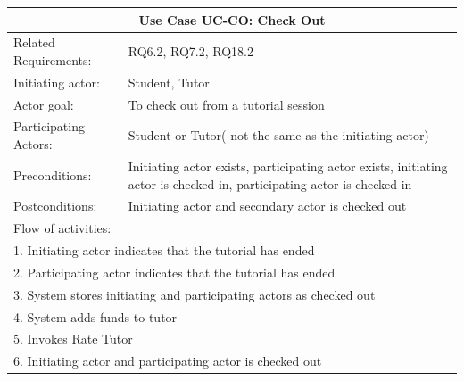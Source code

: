 \documentclass[12pt]{article}
\begin{document}
		\begin{tabular}{| l | p{10cm}| }
			\hline\multicolumn{2}{|c|}{ \textbf{Use Case UC-CO: Check Out } }\\ \hline
			Related Requirements: &  RQ6.2, RQ7.2, RQ18.2\\ \hline
			Initiating actor: & Student, Tutor \\ \hline
			Actor goal: & To check out from a tutorial session\\ \hline
			Participating Actors: & Student or Tutor( not the same as the initiating actor)\\ \hline
			Preconditions: &Initiating actor exists, participating actor exists, initiating actor is checked in, participating actor is checked in\\ \hline
			Postconditions: &Initiating actor and secondary actor is checked out\\ \hline
			\multicolumn{2}{|l|}{Flow of activities:}\\ \hline
			\multicolumn{2}{|p{15cm}|}{1. Initiating actor indicates that the tutorial has ended}\\
			\multicolumn{2}{|p{15cm}|}{2. Participating actor indicates that the tutorial has ended}\\
			\multicolumn{2}{|l|}{3. System stores initiating and participating actors as checked out}\\
      \multicolumn{2}{|l|}{4. System adds funds to tutor}\\
			\multicolumn{2}{|l|}{5. Invokes Rate Tutor}\\
			\multicolumn{2}{|l|}{6. Initiating actor and participating actor is checked out}\\
			 \hline
		\end{tabular}
\end{document}

